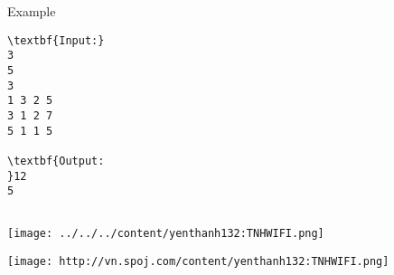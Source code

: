 Example
\begin{verbatim}
\textbf{Input:}
3
5
3
1 3 2 5
3 1 2 7
5 1 1 5

\textbf{Output:
}12
5


\end{verbatim}


\texttt{[image: ../../../content/yenthanh132:TNHWIFI.png]}


\texttt{[image: http://vn.spoj.com/content/yenthanh132:TNHWIFI.png]}